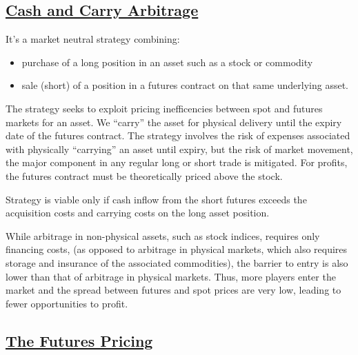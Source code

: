 \documentclass{article}
\begin{document}
\subsection{\href{https://www.investopedia.com/terms/c/cash-and-carry-arbitrage.asp}{Cash and Carry Arbitrage}}
It's a market neutral strategy combining:
\begin{itemize}
    \item purchase of a long position in an asset such as a stock or commodity
    \item sale (short) of a position in a futures contract on that same underlying asset.
\end{itemize}
The strategy seeks to exploit pricing inefficencies between spot and futures markets for an asset.
We ``carry'' the asset for physical delivery until the expiry date of the futures contract.
The strategy involves the risk of expenses associated with physically ``carrying'' an asset until expiry, but
the risk of market movement, the major component in any regular long or short trade is mitigated.
For profits, the futures contract must be theoretically priced above the stock.
\begin{center}
\begin{framed}
    Strategy is viable only if cash inflow from the short futures exceeds the acquisition costs
    and carrying costs on the long asset position.
\end{framed}
\end{center}
While arbitrage in non-physical assets, such as stock indices, requires only financing costs,
(as opposed to arbitrage in physical markets, which also requires storage and insurance of the 
associated commodities), the barrier to entry is also lower than that of arbitrage in physical
markets. Thus, more players enter the market and the spread between futures and spot prices
are very low, leading to fewer opportunities to profit.
\subsection{\href{https://zerodha.com/varsity/chapter/futures-pricing/}{The Futures Pricing}}
\end{document}
